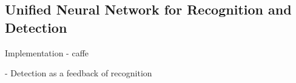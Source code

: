 

\subsection{Unified Neural Network for Recognition and Detection}

Implementation - caffe~\cite{jia2014caffe}

\cite{Kruger2013Deep, beck2009top, desimone1998visual, desimone1995neural}



\cite{Cichy2014Resolving} - Detection as a feedback of recognition

